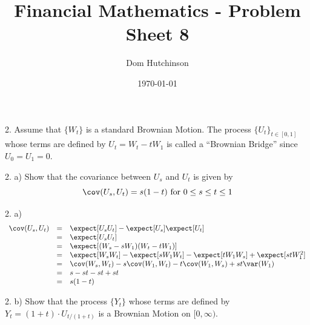 \documentclass[11pt,a4paper]{article}
\begin{document}
\questionsfalse

\title{Financial Mathematics - Problem Sheet 8}
\author{Dom Hutchinson}
\date{\today}
\maketitle

\begin{question}{2.}
  Assume that $\{W_t\}$ is a standard Brownian Motion. The process $\{U_t\}_{t\in[0,1]}$ whose terms are defined by $U_t=W_t-tW_1$ is called a ``Brownian Bridge'' since $U_0=U_1=0$.
\end{question}

\begin{question}{2. a)}
  Show that the covariance between $U_s$ and $U_t$ is given by
  \[ \cov(U_s,U_t)=s(1-t)\text{ for }0\leq s\leq t\leq1 \]
\end{question}

\begin{answer}{2. a)}
  \[\begin{array}{rcl}
    \cov(U_s,U_t)&=&\expect[U_sU_t]-\expect[U_s]\expect[U_t]\\
    &=&\expect[U_sU_t]\\
    &=&\expect[(W_s-sW_1)(W_t-tW_1)]\\
    &=&\expect[W_sW_t]-\expect[sW_1W_t]-\expect[tW_1W_s]+\expect[stW_1^2]\\
    &=&\cov(W_s,W_t)-s\cov(W_1,W_t)-t\cov(W_1,W_s)+st\var(W_1)\\
    &=&s-st-st+st\\
    &=&s(1-t)
  \end{array}\]
\end{answer}

\begin{question}{2. b)}
  Show that the process $\{Y_t\}$ whose terms are defined by $Y_t=(1+t)\cdot U_{t/(1+t)}$ is a Brownian Motion on $[0,\infty)$.
\end{question}
\end{document}
